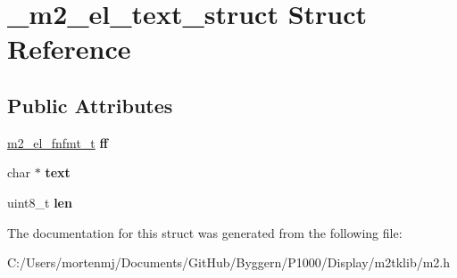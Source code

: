 \hypertarget{struct__m2__el__text__struct}{\section{\-\_\-m2\-\_\-el\-\_\-text\-\_\-struct Struct Reference}
\label{struct__m2__el__text__struct}
}
\subsection*{Public Attributes}
\begin{DoxyCompactItemize}
\item 
\hypertarget{struct__m2__el__text__struct_a8fa6e629ad0e8b372664a1040a4f0e8e}{\hyperlink{struct__m2__el__fnfmt__struct}{m2\-\_\-el\-\_\-fnfmt\-\_\-t} {\bfseries ff}}\label{struct__m2__el__text__struct_a8fa6e629ad0e8b372664a1040a4f0e8e}

\item 
\hypertarget{struct__m2__el__text__struct_aa9cc9d6ba2bd9e7ec8dc4ca4657ce4c0}{char $\ast$ {\bfseries text}}\label{struct__m2__el__text__struct_aa9cc9d6ba2bd9e7ec8dc4ca4657ce4c0}

\item 
\hypertarget{struct__m2__el__text__struct_ae9b7c6f7024c92a1a7c69d72690caed7}{uint8\-\_\-t {\bfseries len}}\label{struct__m2__el__text__struct_ae9b7c6f7024c92a1a7c69d72690caed7}

\end{DoxyCompactItemize}


The documentation for this struct was generated from the following file\-:\begin{DoxyCompactItemize}
\item 
C\-:/\-Users/mortenmj/\-Documents/\-Git\-Hub/\-Byggern/\-P1000/\-Display/m2tklib/m2.\-h\end{DoxyCompactItemize}
